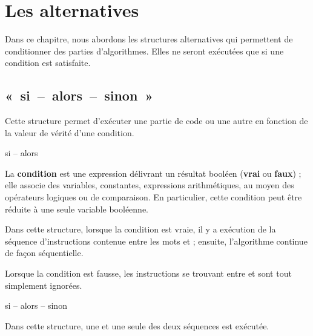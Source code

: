 \chapter{Les alternatives}

Dans ce chapitre, nous abordons les structures alternatives qui
permettent de conditionner des parties d’algorithmes.
Elles ne seront exécutées que si une condition est satisfaite.

\section{«~si~–~alors~–~sinon~»}

Cette structure permet d’exécuter une partie de code ou
une autre en fonction de la valeur de vérité d’une
condition.

\begin{Emphase}[definition]{si – alors}
\end{Emphase}

La \textbf{condition} est une expression délivrant un résultat booléen
(\textbf{vrai} ou \textbf{faux}) ; elle associe des variables,
constantes, expressions arithmétiques, au moyen des opérateurs logiques
ou de comparaison. En particulier, cette condition peut être réduite à
une seule variable booléenne.

Dans cette structure, lorsque la condition est vraie, il y a exécution
de la séquence d’instructions contenue entre les mots
 et  ; ensuite,
l’algorithme continue de façon séquentielle.

Lorsque la condition est fausse, les instructions se trouvant entre
 et  sont tout simplement
ignorées.


\begin{Emphase}[definition]{si – alors – sinon}
\end{Emphase}

Dans cette structure, une et une seule des deux séquences est exécutée.


